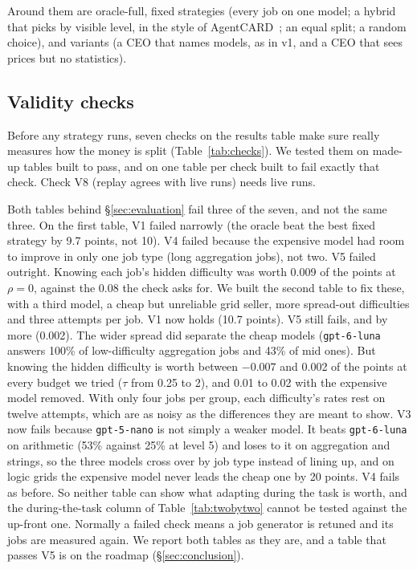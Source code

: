 Around them are oracle-full, fixed strategies (every job on one model; a hybrid that picks by visible level, in the
style of AgentCARD~\cite{jiang2026specialize}; an equal split; a random choice), and \sys{} variants (a CEO that names
models, as in v1, and a CEO that sees prices but no statistics).

\subsection{Validity checks}
\label{sec:checks}
Before any strategy runs, seven checks on the results table make sure \bench{} really measures how the money is split
(Table~\ref{tab:checks}). We tested them on made-up tables built to pass, and on one table per check built to fail
exactly that check. Check V8 (replay agrees with live runs) needs live runs.

Both tables behind \S\ref{sec:evaluation} fail three of the seven, and not the same three. On the first table, V1
failed narrowly (the oracle beat the best fixed strategy by 9.7 points, not 10). V4 failed because the expensive model
had room to improve in only one job type (long aggregation jobs), not two. V5 failed outright. Knowing each job's
hidden difficulty was worth 0.009 of the points at $\rho = 0$, against the 0.08 the check asks for. We built the second
table to fix these, with a third model, a cheap but unreliable grid seller, more spread-out difficulties and three
attempts per job. V1 now holds (10.7 points). V5 still fails, and by more (0.002). The wider spread did separate the
cheap models (\texttt{gpt-6-luna} answers 100\% of low-difficulty aggregation jobs and 43\% of mid ones). But knowing
the hidden difficulty is worth between $-0.007$ and 0.002 of the points at every budget we tried ($\tau$ from 0.25 to
2), and 0.01 to 0.02 with the expensive model removed. With only four jobs per group, each difficulty's rates rest on
twelve attempts, which are as noisy as the differences they are meant to show. V3 now fails because
\texttt{gpt-5-nano} is not simply a weaker model. It beats \texttt{gpt-6-luna} on arithmetic (53\% against 25\% at
level 5) and loses to it on aggregation and strings, so the three models cross over by job type instead of lining up,
and on logic grids the expensive model never leads the cheap one by 20 points. V4 fails as before. So neither table can
show what adapting during the task is worth, and the during-the-task column of Table~\ref{tab:twobytwo} cannot be
tested against the up-front one. Normally a failed check means a job generator is retuned and its jobs are measured
again. We report both tables as they are, and a table that passes V5 is on the roadmap (\S\ref{sec:conclusion}).

